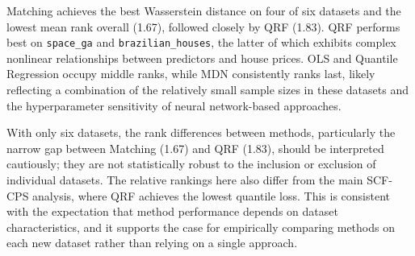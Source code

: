 Matching achieves the best Wasserstein distance on four of six datasets and the lowest mean rank overall (1.67), followed closely by QRF (1.83). QRF performs best on \texttt{space\_ga} and \texttt{brazilian\_houses}, the latter of which exhibits complex nonlinear relationships between predictors and house prices. OLS and Quantile Regression occupy middle ranks, while MDN consistently ranks last, likely reflecting a combination of the relatively small sample sizes in these datasets and the hyperparameter sensitivity of neural network-based approaches.

With only six datasets, the rank differences between methods, particularly the narrow gap between Matching (1.67) and QRF (1.83), should be interpreted cautiously; they are not statistically robust to the inclusion or exclusion of individual datasets. The relative rankings here also differ from the main SCF-CPS analysis, where QRF achieves the lowest quantile loss. This is consistent with the expectation that method performance depends on dataset characteristics, and it supports the case for empirically comparing methods on each new dataset rather than relying on a single approach.
